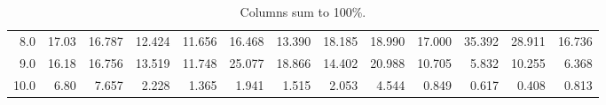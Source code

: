 \begin{table*}
\begin{center}
\begin{tabular}{|r|r||r|r|r|r|r|r|r|r|r|r|r|}
8.0   &  17.03  &  16.787 & 12.424 & 11.656 & 16.468 & 13.390 & 18.185 & 18.990 & 17.000 & 35.392 & 28.911 & 16.736 \\
9.0   &  16.18  &  16.756 & 13.519 & 11.748 & 25.077 & 18.866 & 14.402 & 20.988 & 10.705 &  5.832 & 10.255 &  6.368 \\
10.0  &  6.80   &   7.657 &  2.228 &  1.365 &  1.941 &  1.515 &  2.053 &  4.544 &  0.849 &  0.617 &  0.408 &  0.813 \\
\hline
\end{tabular}
\caption{Columns sum to 100\%.}
\end{center}
\end{table*}

\fi
